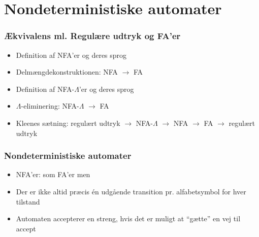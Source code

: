 \section{Nondeterministiske automater}
\begin{frame}
\frametitle{Ækvivalens ml. Regulære udtryk og FA'er}
  \begin{itemize}[<+->]
  \item Definition af NFA’er og deres sprog
\item Delmængdekonstruktionen:  NFA $\rightarrow$ FA
\item Definition af NFA-$\Lambda$’er og deres sprog
\item $\Lambda$-eliminering:  NFA-$\Lambda$ $\rightarrow$ FA
\item Kleenes sætning: regulært udtryk $\rightarrow$ NFA-$\Lambda$ $\rightarrow$ NFA $\rightarrow$ FA $\rightarrow$ regulært udtryk
  \end{itemize}
\end{frame}


\begin{frame}
\frametitle{Nondeterministiske automater}
\begin{itemize}[<+->]
\item  NFA’er: som FA’er men
\item Der er ikke altid præcis én udgående transition pr. alfabetsymbol for hver tilstand
\item Automaten accepterer en streng, hvis det er muligt at ``gætte'' en vej til accept
\end{itemize}

\end{frame}

